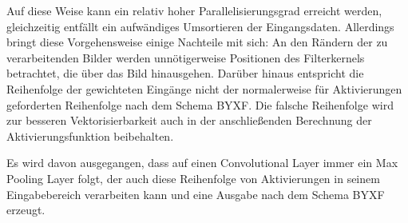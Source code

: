 \documentclass[../main.tex]{subfiles}
\begin{document}
Auf diese Weise kann ein relativ hoher Parallelisierungsgrad erreicht werden, gleichzeitig entfällt ein aufwändiges Umsortieren der Eingangsdaten. Allerdings bringt diese Vorgehensweise einige Nachteile mit sich: An den Rändern der zu verarbeitenden Bilder werden unnötigerweise Positionen des Filterkernels betrachtet, die über das Bild hinausgehen. Darüber hinaus entspricht die Reihenfolge der gewichteten Eingänge nicht der normalerweise für Aktivierungen geforderten Reihenfolge nach dem Schema BYXF. Die falsche Reihenfolge wird zur besseren Vektorisierbarkeit auch in der anschließenden Berechnung der Aktivierungsfunktion beibehalten. 

Es wird davon ausgegangen, dass auf einen Convolutional Layer immer ein Max Pooling Layer folgt, der auch diese Reihenfolge von Aktivierungen in seinem Eingabebereich verarbeiten kann und eine Ausgabe nach dem Schema BYXF erzeugt. 
\end{document}
